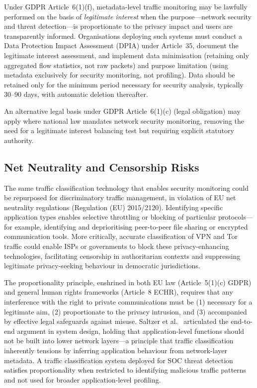 \documentclass[conference]{IEEEtran}
\begin{document}
Under GDPR Article~6(1)(f), metadata-level traffic monitoring may be lawfully
performed on the basis of \textit{legitimate interest} when the purpose---network
security and threat detection---is proportionate to the privacy impact and users
are transparently informed. Organisations deploying such systems must conduct a
Data Protection Impact Assessment (DPIA) under Article~35, document the
legitimate interest assessment, and implement data minimisation (retaining only
aggregated flow statistics, not raw packets) and purpose limitation (using
metadata exclusively for security monitoring, not profiling). Data should be
retained only for the minimum period necessary for security analysis, typically
30--90 days, with automatic deletion thereafter.

An alternative legal basis under GDPR Article~6(1)(c) (legal obligation) may
apply where national law mandates network security monitoring, removing the need
for a legitimate interest balancing test but requiring explicit statutory
authority.

\subsection{Net Neutrality and Censorship Risks}

The same traffic classification technology that enables security monitoring
could be repurposed for discriminatory traffic management, in violation of EU
net neutrality regulations (Regulation (EU) 2015/2120). Identifying specific
application types enables selective throttling or blocking of particular
protocols---for example, identifying and deprioritising peer-to-peer file
sharing or encrypted communication tools. More critically, accurate
classification of VPN and Tor traffic could enable ISPs or governments to
block these privacy-enhancing technologies, facilitating censorship in
authoritarian contexts and suppressing legitimate privacy-seeking behaviour in
democratic jurisdictions.

The proportionality principle, enshrined in both EU law (Article~5(1)(c) GDPR)
and general human rights frameworks (Article~8 ECHR), requires that any
interference with the right to private communications must be (1) necessary for
a legitimate aim, (2) proportionate to the privacy intrusion, and (3)
accompanied by effective legal safeguards against misuse. Saltzer et al.\
\cite{saltzer1984} articulated the end-to-end argument in system design,
holding that application-level functions should not be built into lower network
layers---a principle that traffic classification inherently tensions by
inferring application behaviour from network-layer metadata. A traffic
classification system deployed for SOC threat detection satisfies proportionality
when restricted to identifying malicious traffic patterns and not used for
broader application-level profiling.
\end{document}
